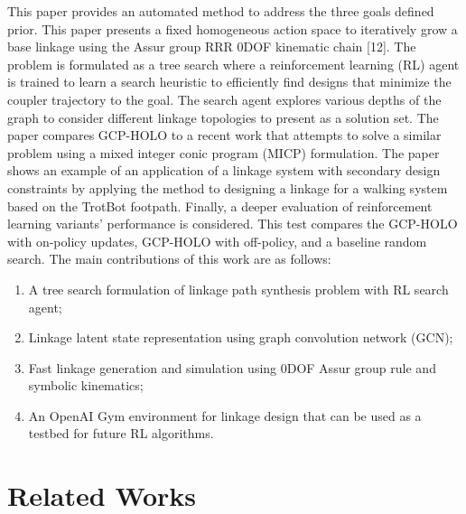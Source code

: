 This paper provides an automated method to address the three goals defined prior. This paper presents a fixed homogeneous action space to iteratively grow a base linkage using the Assur group RRR 0DOF kinematic chain [12]. The problem is formulated as a tree search where a reinforcement learning (RL) agent is trained to learn a search heuristic to efficiently find designs that minimize the coupler trajectory to the goal. The search agent explores various depths of the graph to consider different linkage topologies to present as a solution set. The paper compares GCP-HOLO to a recent work that attempts to solve a similar problem using a mixed integer conic program (MICP) formulation. The paper shows an example of an application of a linkage system with secondary design constraints by applying the method to designing a linkage for a walking system based on the TrotBot footpath. Finally, a deeper evaluation of reinforcement learning variants’ performance is considered. This test compares the GCP-HOLO with on-policy updates, GCP-HOLO with off-policy, and a baseline random search. The main contributions of this work are as follows:
\begin{enumerate} 
    \item A tree search formulation of linkage path synthesis problem with RL search agent;
    \item Linkage latent state representation using graph convolution network (GCN);
    \item Fast linkage generation and simulation using 0DOF Assur group rule and symbolic kinematics;
    \item An OpenAI Gym environment for linkage design that can be used as a testbed for future RL algorithms.
\end{enumerate}

\section{Related Works}
